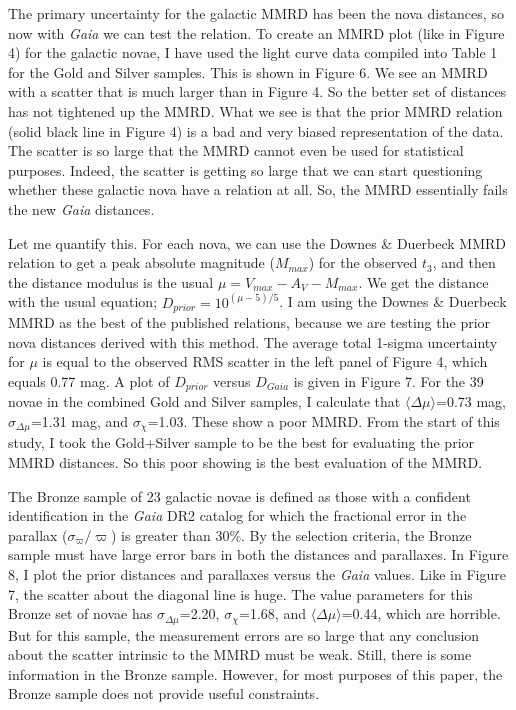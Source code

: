 \documentclass[a4paper,fleqn,usenatbib]{mnras}
\begin{document}
The primary uncertainty for the galactic MMRD has been the nova distances, so now with {\it Gaia} we can test the relation.  To create an MMRD plot (like in Figure 4) for the galactic novae, I have used the light curve data compiled into Table 1 for the Gold and Silver samples.  This is shown in Figure 6.  We see an MMRD with a scatter that is much larger than in Figure 4.  So the better set of distances has not tightened up the MMRD.  What we see is that the prior MMRD relation (solid black line in Figure 4) is a bad and very biased representation of the data.  The scatter is so large that the MMRD cannot even be used for statistical purposes.  Indeed, the scatter is getting so large that we can start questioning whether these galactic nova have a relation at all.  So, the MMRD essentially fails the new {\it Gaia} distances.

Let me quantify this.  For each nova, we can use the Downes \& Duerbeck MMRD relation to get a peak absolute magnitude ($M_{max}$) for the observed $t_3$, and then the distance modulus is the usual $\mu=V_{max}-A_V-M_{max}$.  We get the distance with the usual equation; $D_{prior}=10^{(\mu-5)/5}$.   I am using the Downes \& Duerbeck MMRD as the best of the published relations, because we are testing the prior nova distances derived with this method.  The average total 1-sigma uncertainty for $\mu$ is equal to the observed RMS scatter in the left panel of Figure 4, which equals 0.77 mag.  A plot of $D_{prior}$ versus $D_{Gaia}$ is given in Figure 7.  For the 39 novae in the combined Gold and Silver samples, I calculate that $\langle \Delta \mu \rangle$=0.73 mag,$\sigma _{\Delta \mu}$=1.31 mag, and $\sigma _{\chi}$=1.03.  These show a poor MMRD.  From the start of this study, I took the Gold+Silver sample to be the best for evaluating the prior MMRD distances.  So this poor showing is the best evaluation of the MMRD.

The Bronze sample of 23 galactic novae is defined as those with a confident identification in the {\it Gaia} DR2 catalog for which the fractional error in the parallax ($\sigma_{\varpi}/\varpi$) is greater than 30\%.  By the selection criteria, the Bronze sample must have large error bars in both the distances and parallaxes.  In Figure 8, I plot the prior distances and parallaxes versus the {\it Gaia} values.  Like in Figure 7, the scatter about the diagonal line is huge.  The value parameters for this Bronze set of novae has $\sigma_{\Delta \mu}$=2.20, $\sigma_{\chi}$=1.68, and $\langle \Delta \mu \rangle$=0.44, which are horrible.  But for this sample, the measurement errors are so large that any conclusion about the scatter intrinsic to the MMRD must be weak.  Still, there is some information in the Bronze sample.  However, for most purposes of this paper, the Bronze sample does not provide useful constraints.
\end{document}
